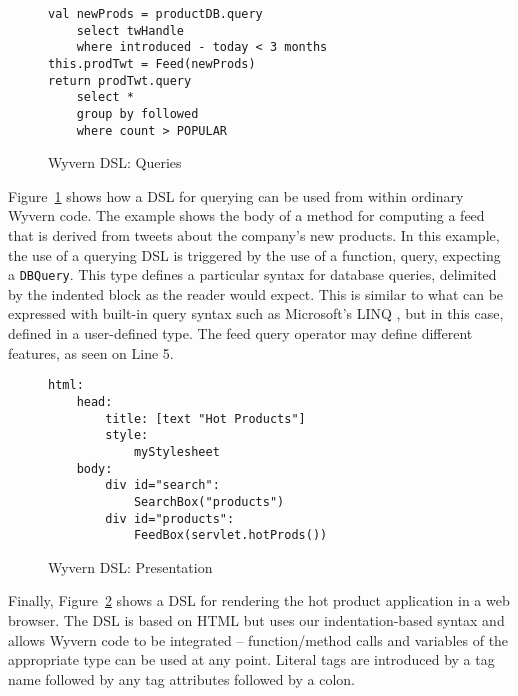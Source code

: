 \begin{figure}
  \centering
  \begin{lstlisting}
val newProds = productDB.query 
    select twHandle 
    where introduced - today < 3 months
this.prodTwt = Feed(newProds)
return prodTwt.query
    select *
    group by followed
    where count > POPULAR  
  \end{lstlisting}
  \caption{Wyvern DSL: Queries}
  \label{f:dsl-query}
\end{figure}

Figure~\ref{f:dsl-query} shows how a DSL for querying can be used from within ordinary Wyvern code.  The example shows the body of a method for computing a feed that is derived from tweets about the company's new products.  In this example, the use of a querying DSL is triggered by the use of a function, query, expecting a \verb|DBQuery|.  This type defines a particular syntax for database queries, delimited by the indented block as the reader would expect. This is similar to what can be expressed with built-in query syntax such as Microsoft's LINQ \cite{mslinq}, but in this case, defined in a user-defined type. The feed query operator may define different features, as seen on Line 5.
\begin{figure}
  \centering
  \begin{lstlisting}
html:
    head:
        title: [text "Hot Products"]
        style:
            myStylesheet
    body:
        div id="search":
            SearchBox("products")
        div id="products":
            FeedBox(servlet.hotProds())
  \end{lstlisting}
  \caption{Wyvern DSL: Presentation}
  \label{f:dsl-presentation}
\end{figure}

Finally, Figure~\ref{f:dsl-presentation} shows a DSL for rendering the hot product application in a web browser.  The DSL is based on HTML but uses our indentation-based syntax and allows Wyvern code to be integrated -- function/method calls and variables of the appropriate type can be used at any point. Literal tags are introduced by a tag name followed by any tag attributes followed by a colon.
